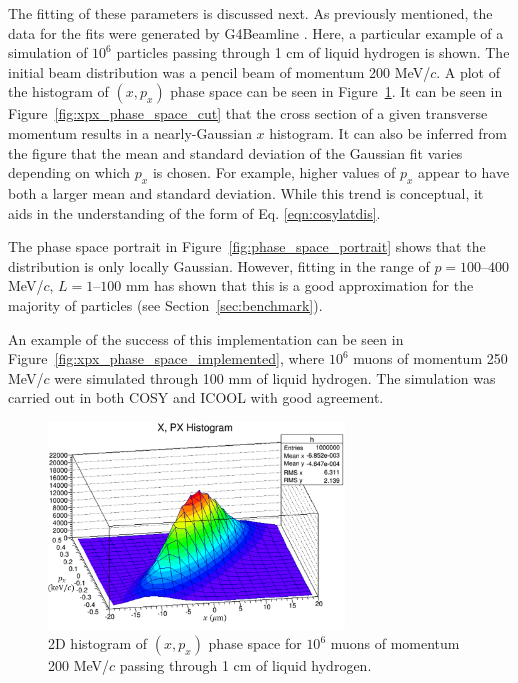 The fitting of these parameters is discussed next. As previously mentioned, the data for the fits were generated by G4Beamline \cite{g4bl}. Here, a particular example of a simulation of $10^6$ particles passing through 1 cm of liquid hydrogen is shown. The initial beam distribution was a pencil beam of momentum 200 MeV/$c$. A plot of the histogram of $(x,p_x)$ phase space can be seen in Figure~\ref{fig:xpx_phase_space}. It can be seen in Figure~\ref{fig:xpx_phase_space_cut} that the cross section of a given transverse momentum results in a nearly-Gaussian $x$ histogram. It can also be inferred from the figure that the mean and standard deviation of the Gaussian fit varies depending on which $p_x$ is chosen. For example, higher values of $p_x$ appear to have both a larger mean and standard deviation. While this trend is conceptual, it aids in the understanding of the form of Eq. \eqref{eqn:cosylatdis}.

The phase space portrait in Figure~\ref{fig:phase_space_portrait} shows that the distribution is only locally Gaussian. However, fitting in the range of $p=100\text{--}400$ MeV/$c$, $L=1\text{--}100$ mm has shown that this is a good approximation for the majority of particles (see Section~\ref{sec:benchmark}).

An example of the success of this implementation can be seen in Figure~\ref{fig:xpx_phase_space_implemented}, where $10^6$ muons of momentum 250 MeV/$c$ were simulated through 100 mm of liquid hydrogen. The simulation was carried out in both COSY and ICOOL \cite{icool} with good agreement.

\begin{figure}[H]
  \centering
    \includegraphics[width=0.7\textwidth]{Figures/xpx_phase_space} 
  \caption[2D histogram of $(x,p_x)$ phase space.]{2D histogram of $(x,p_x)$ phase space for $10^6$ muons of momentum 200 MeV/$c$ passing through 1 cm of liquid hydrogen.}
  \label{fig:xpx_phase_space}
\end{figure}

